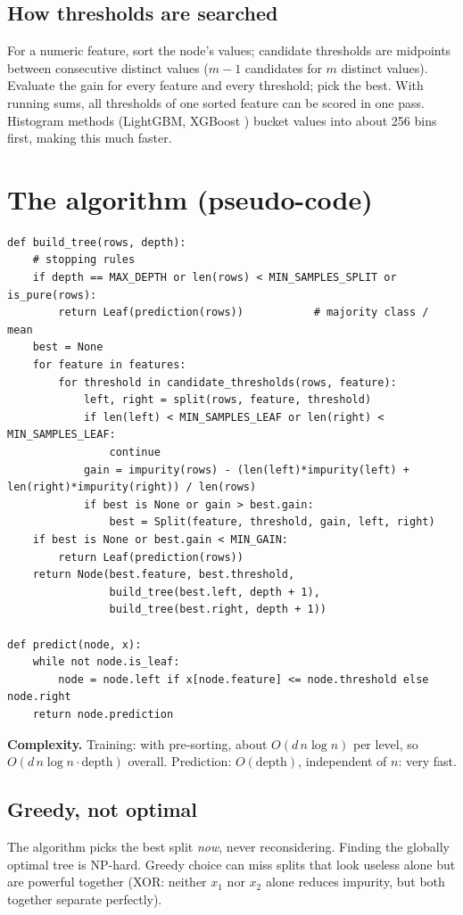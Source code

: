\subsection{How thresholds are searched}
For a numeric feature, sort the node's values; candidate thresholds are midpoints between consecutive distinct values
($m - 1$ candidates for $m$ distinct values). Evaluate the gain for every feature and every threshold; pick the best. With
running sums, all thresholds of one sorted feature can be scored in one pass. Histogram methods (LightGBM, XGBoost
) bucket values into about 256 bins first, making this much faster.

\section{The algorithm (pseudo-code)}
\begin{lstlisting}
def build_tree(rows, depth):
    # stopping rules
    if depth == MAX_DEPTH or len(rows) < MIN_SAMPLES_SPLIT or is_pure(rows):
        return Leaf(prediction(rows))           # majority class / mean
    best = None
    for feature in features:
        for threshold in candidate_thresholds(rows, feature):
            left, right = split(rows, feature, threshold)
            if len(left) < MIN_SAMPLES_LEAF or len(right) < MIN_SAMPLES_LEAF:
                continue
            gain = impurity(rows) - (len(left)*impurity(left) + len(right)*impurity(right)) / len(rows)
            if best is None or gain > best.gain:
                best = Split(feature, threshold, gain, left, right)
    if best is None or best.gain < MIN_GAIN:
        return Leaf(prediction(rows))
    return Node(best.feature, best.threshold,
                build_tree(best.left, depth + 1),
                build_tree(best.right, depth + 1))

def predict(node, x):
    while not node.is_leaf:
        node = node.left if x[node.feature] <= node.threshold else node.right
    return node.prediction
\end{lstlisting}
\textbf{Complexity.} Training: with pre-sorting, about $O(d\,n\log n)$ per level, so $O(d\,n\log n\cdot\text{depth})$ overall.
Prediction: $O(\text{depth})$, independent of $n$: very fast.

\subsection{Greedy, not optimal}
The algorithm picks the best split \emph{now}, never reconsidering. Finding the globally optimal tree is NP-hard. Greedy
choice can miss splits that look useless alone but are powerful together (XOR: neither $x_1$ nor $x_2$ alone reduces
impurity, but both together separate perfectly).

